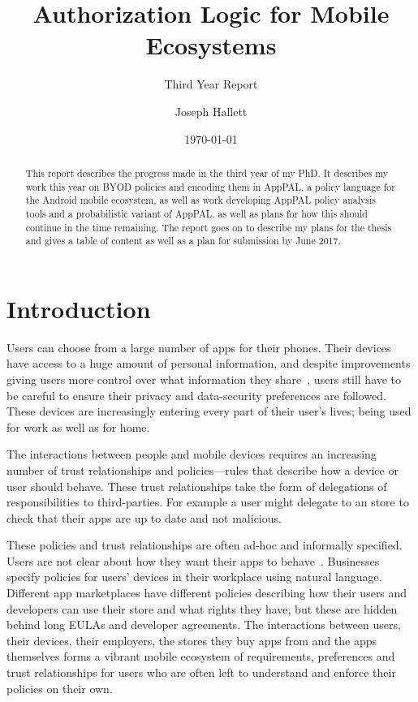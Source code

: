 \documentclass[a4paper]{scrartcl}
\title{Authorization Logic for Mobile Ecosystems}
\subtitle{Third Year Report}
\author{Joseph Hallett}
\date\today
\begin{document}
\maketitle

\begin{abstract}
  This report describes the progress made in the third year of my PhD. It
  describes my work this year on BYOD policies and encoding them in AppPAL, a
  policy language for the Android mobile ecosystem, as well as work developing
  AppPAL policy analysis tools and a probabilistic variant of AppPAL, as well as
  plans for how this should continue in the time remaining. The report goes on to
  describe my plans for the thesis and gives a table of content as well as a plan
  for submission by June 2017.
\end{abstract}

\section{Introduction}
\label{sec:introduction}

Users can choose from a large number of apps for their phones. Their devices
have access to a huge amount of personal information, and despite improvements
giving users more control over what information they
share~\cite{_requesting_????,_system_????}, users still have to be careful to
ensure their privacy and data-security preferences are followed. These devices
are increasingly entering every part of their user's lives; being used for work
as well as for home.

The interactions between people and mobile devices requires an increasing number
of trust relationships and policies---rules that describe how a device or user
should behave. These trust relationships take the form of delegations of
responsibilities to third-parties. For example a user might delegate to an store
to check that their apps are up to date and not malicious.

These policies and trust relationships are often ad-hoc and informally
specified. Users are not clear about how they want their apps to behave~\cite{lin_modeling_2014}.
Businesses specify policies for users' devices in their workplace using natural
language. Different app marketplaces have different policies describing how
their users and developers can use their store and what rights they have, but
these are hidden behind long EULAs and developer agreements. The interactions
between users, their devices, their employers, the stores they buy apps from and
the apps themselves forms a vibrant mobile ecosystem of requirements,
preferences and trust relationships for users who are often left to understand
and enforce their policies on their own.
\end{document}
